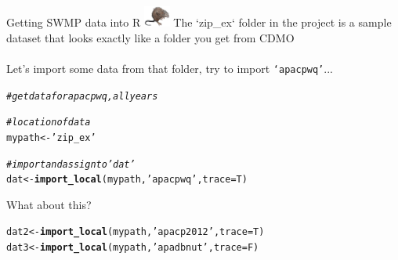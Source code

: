 \documentclass[xcolor=dvipsnames,serif]{beamer}\usepackage[]{graphicx}\usepackage[]{color}
\makeatletter
\newcommand{\hlstr}[1]{\textcolor[rgb]{0.192,0.494,0.8}{#1}}%
\newcommand{\hlcom}[1]{\textcolor[rgb]{0.678,0.584,0.686}{\textit{#1}}}%
\newcommand{\hlstd}[1]{\textcolor[rgb]{0.345,0.345,0.345}{#1}}%
\newcommand{\hlkwb}[1]{\textcolor[rgb]{0.69,0.353,0.396}{#1}}%
\newcommand{\hlkwc}[1]{\textcolor[rgb]{0.333,0.667,0.333}{#1}}%
\newcommand{\hlkwd}[1]{\textcolor[rgb]{0.737,0.353,0.396}{\textbf{#1}}}%
\newenvironment{kframe}{%
 \def\at@end@of@kframe{}%
 \ifinner\ifhmode%
  \def\at@end@of@kframe{\end{minipage}}%
  \begin{minipage}{\columnwidth}%
 \fi\fi%
 \def\FrameCommand##1{\hskip\@totalleftmargin \hskip-\fboxsep
 \colorbox{shadecolor}{##1}\hskip-\fboxsep
     \hskip-\linewidth \hskip-\@totalleftmargin \hskip\columnwidth}%
 \MakeFramed {\advance\hsize-\width
   \@totalleftmargin\z@ \linewidth\hsize
   \@setminipage}}%
 {\par\unskip\endMakeFramed%
 \at@end@of@kframe}
\newenvironment{knitrout}{}{} %
\makeatother
\begin{document}
\begin{frame}[fragile]{Getting SWMP data into R \includegraphics[width = 0.065\textwidth]{imgs/swmprat.png}}
\onslide<+->
The `zip\_ex` folder in the project is a sample dataset that looks exactly like a folder you get from CDMO \\~\\
Let's import some data from that folder, try to import \texttt{`apacpwq'}...
\onslide<+->
\begin{knitrout}\scriptsize
{}\color{fgcolor}\begin{kframe}
\begin{alltt}
\hlcom{# get data for apacpwq, all years}

\hlcom{# location of data}
\hlstd{mypath} \hlkwb{<-} \hlstr{'zip_ex'}

\hlcom{# import and assign to 'dat'}
\hlstd{dat} \hlkwb{<-} \hlkwd{import_local}\hlstd{(mypath,} \hlstr{'apacpwq'}\hlstd{,} \hlkwc{trace} \hlstd{= T)}
\end{alltt}
\end{kframe}
\end{knitrout}
\onslide<+->
What about this?
\begin{knitrout}\scriptsize
{}\color{fgcolor}\begin{kframe}
\begin{alltt}
\hlstd{dat2} \hlkwb{<-} \hlkwd{import_local}\hlstd{(mypath,} \hlstr{'apacp2012'}\hlstd{,} \hlkwc{trace} \hlstd{= T)}
\hlstd{dat3} \hlkwb{<-} \hlkwd{import_local}\hlstd{(mypath,} \hlstr{'apadbnut'}\hlstd{,} \hlkwc{trace} \hlstd{= F)}
\end{alltt}
\end{kframe}
\end{knitrout}

\end{frame}
\end{document}
